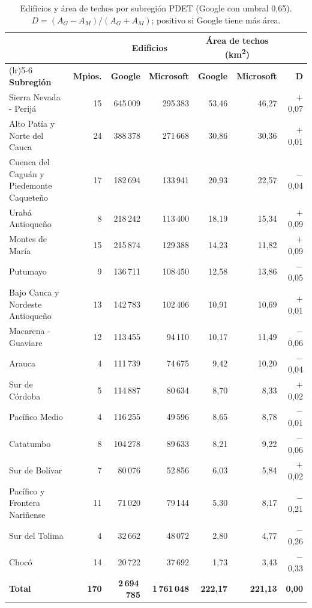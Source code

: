 \begin{table}[H]
\centering\small
\caption{Edificios y área de techos por subregión PDET (Google con umbral 0,65). $D = (A_G - A_M)/(A_G + A_M)$; positivo si Google tiene más área.}
\label{tab:subregion}
\begin{tabularx}{\textwidth}{@{}>{\raggedright\arraybackslash}Xrrrrrr@{}}
\toprule
 & & \multicolumn{2}{c}{\textbf{Edificios}} & \multicolumn{2}{c}{\textbf{Área de techos (km\textsuperscript{2})}} & \\
\cmidrule(lr){3-4}\cmidrule(lr){5-6}
\textbf{Subregión} & \textbf{Mpios.} & \textbf{Google} & \textbf{Microsoft} & \textbf{Google} & \textbf{Microsoft} & $\boldsymbol{D}$ \\
\midrule
Sierra Nevada - Perijá & 15 & 645\,009 & 295\,383 & 53,46 & 46,27 & $+$0,07 \\
Alto Patía y Norte del Cauca & 24 & 388\,378 & 271\,668 & 30,86 & 30,36 & $+$0,01 \\
Cuenca del Caguán y Piedemonte Caqueteño & 17 & 182\,694 & 133\,941 & 20,93 & 22,57 & $-$0,04 \\
Urabá Antioqueño & 8 & 218\,242 & 113\,400 & 18,19 & 15,34 & $+$0,09 \\
Montes de María & 15 & 215\,874 & 129\,388 & 14,23 & 11,82 & $+$0,09 \\
Putumayo & 9 & 136\,711 & 108\,450 & 12,58 & 13,86 & $-$0,05 \\
Bajo Cauca y Nordeste Antioqueño & 13 & 142\,783 & 102\,406 & 10,91 & 10,69 & $+$0,01 \\
Macarena - Guaviare & 12 & 113\,455 & 94\,110 & 10,17 & 11,49 & $-$0,06 \\
Arauca & 4 & 111\,739 & 74\,675 & 9,42 & 10,20 & $-$0,04 \\
Sur de Córdoba & 5 & 114\,887 & 80\,634 & 8,70 & 8,33 & $+$0,02 \\
Pacífico Medio & 4 & 116\,255 & 49\,596 & 8,65 & 8,78 & $-$0,01 \\
Catatumbo & 8 & 104\,278 & 89\,633 & 8,21 & 9,22 & $-$0,06 \\
Sur de Bolívar & 7 & 80\,076 & 52\,856 & 6,03 & 5,84 & $+$0,02 \\
Pacífico y Frontera Nariñense & 11 & 71\,020 & 79\,144 & 5,30 & 8,17 & $-$0,21 \\
Sur del Tolima & 4 & 32\,662 & 48\,072 & 2,80 & 4,77 & $-$0,26 \\
Chocó & 14 & 20\,722 & 37\,692 & 1,73 & 3,43 & $-$0,33 \\
\midrule
\textbf{Total} & \textbf{170} & \textbf{2\,694\,785} & \textbf{1\,761\,048} & \textbf{222,17} & \textbf{221,13} & \textbf{0,00} \\
\bottomrule
\end{tabularx}
\end{table}
